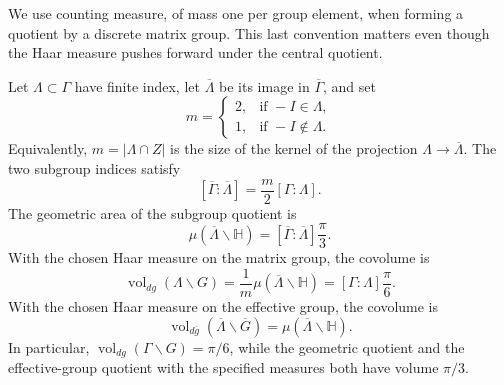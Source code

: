 We use counting measure, of mass one per group element, when forming a quotient by a discrete matrix group. This last convention matters even though the Haar measure pushes forward under the central quotient.

\begin{theorem}\label{modular.central-covolumes}
Let $\Lambda\subset\Gamma$ have finite index, let $\overline\Lambda$ be its image in $\overline\Gamma$, and set
\[
 m=\begin{cases}
 2,&\text{if }-I\in\Lambda,\\
 1,&\text{if }-I\notin\Lambda.
 \end{cases}
\]
Equivalently, $m=|\Lambda\cap Z|$ is the size of the kernel of the projection $\Lambda\to\overline\Lambda$. The two subgroup indices satisfy
\begin{equation}\label{eq:subgroup-effective-index}
 [\overline\Gamma:\overline\Lambda]=\frac{m}{2}[\Gamma:\Lambda].
\end{equation}
The geometric area of the subgroup quotient is
\begin{equation}\label{eq:subgroup-hyperbolic-area}
 \mu(\overline\Lambda\backslash\mathbb H)
 =[\overline\Gamma:\overline\Lambda]\frac\pi3.
\end{equation}
With the chosen Haar measure on the matrix group, the covolume is
\begin{equation}\label{eq:subgroup-matrix-covolume}
 \operatorname{vol}_{dg}(\Lambda\backslash G)
 =\frac1m\mu(\overline\Lambda\backslash\mathbb H)
 =[\Gamma:\Lambda]\frac\pi6.
\end{equation}
With the chosen Haar measure on the effective group, the covolume is
\begin{equation}\label{eq:subgroup-effective-covolume}
 \operatorname{vol}_{d\overline g}(\overline\Lambda\backslash\overline G)
 =\mu(\overline\Lambda\backslash\mathbb H).
\end{equation}
In particular, $\operatorname{vol}_{dg}(\Gamma\backslash G)=\pi/6$, while the geometric quotient and the effective-group quotient with the specified measures both have volume $\pi/3$.
\end{theorem}

